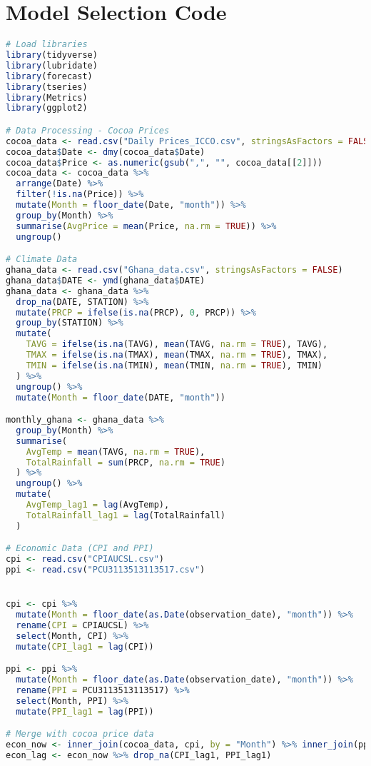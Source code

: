 \chapter{Model Selection Code}
\label{appn:A}

\begin{lstlisting}[language=R]
# Load libraries
library(tidyverse)
library(lubridate)
library(forecast)
library(tseries)
library(Metrics)
library(ggplot2)

# Data Processing - Cocoa Prices
cocoa_data <- read.csv("Daily Prices_ICCO.csv", stringsAsFactors = FALSE)
cocoa_data$Date <- dmy(cocoa_data$Date)
cocoa_data$Price <- as.numeric(gsub(",", "", cocoa_data[[2]]))
cocoa_data <- cocoa_data %>%
  arrange(Date) %>%
  filter(!is.na(Price)) %>%
  mutate(Month = floor_date(Date, "month")) %>%
  group_by(Month) %>%
  summarise(AvgPrice = mean(Price, na.rm = TRUE)) %>%
  ungroup()

# Climate Data
ghana_data <- read.csv("Ghana_data.csv", stringsAsFactors = FALSE)
ghana_data$DATE <- ymd(ghana_data$DATE)
ghana_data <- ghana_data %>%
  drop_na(DATE, STATION) %>%
  mutate(PRCP = ifelse(is.na(PRCP), 0, PRCP)) %>%
  group_by(STATION) %>%
  mutate(
    TAVG = ifelse(is.na(TAVG), mean(TAVG, na.rm = TRUE), TAVG),
    TMAX = ifelse(is.na(TMAX), mean(TMAX, na.rm = TRUE), TMAX),
    TMIN = ifelse(is.na(TMIN), mean(TMIN, na.rm = TRUE), TMIN)
  ) %>%
  ungroup() %>%
  mutate(Month = floor_date(DATE, "month"))

monthly_ghana <- ghana_data %>%
  group_by(Month) %>%
  summarise(
    AvgTemp = mean(TAVG, na.rm = TRUE),
    TotalRainfall = sum(PRCP, na.rm = TRUE)
  ) %>%
  ungroup() %>%
  mutate(
    AvgTemp_lag1 = lag(AvgTemp),
    TotalRainfall_lag1 = lag(TotalRainfall)
  )

# Economic Data (CPI and PPI)
cpi <- read.csv("CPIAUCSL.csv")
ppi <- read.csv("PCU3113513113517.csv")


cpi <- cpi %>%
  mutate(Month = floor_date(as.Date(observation_date), "month")) %>%
  rename(CPI = CPIAUCSL) %>%
  select(Month, CPI) %>%
  mutate(CPI_lag1 = lag(CPI))

ppi <- ppi %>%
  mutate(Month = floor_date(as.Date(observation_date), "month")) %>%
  rename(PPI = PCU3113513113517) %>%
  select(Month, PPI) %>%
  mutate(PPI_lag1 = lag(PPI))

# Merge with cocoa price data
econ_now <- inner_join(cocoa_data, cpi, by = "Month") %>% inner_join(ppi, by = "Month") %>% drop_na(CPI, PPI)
econ_lag <- econ_now %>% drop_na(CPI_lag1, PPI_lag1)


\end{lstlisting}
